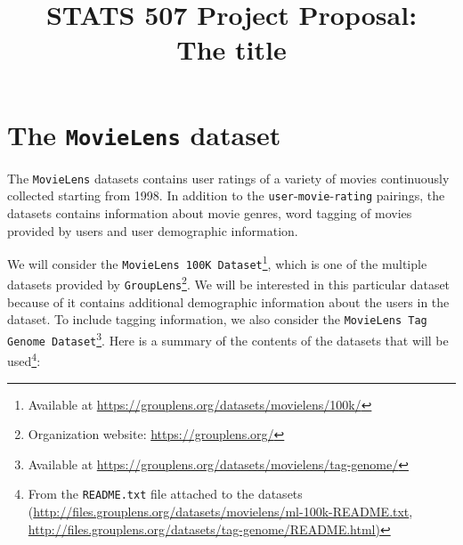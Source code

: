 \documentclass[bj, preprint]{imsart}
\begin{document}
\begin{frontmatter}

\title{{\Large STATS 507 Project Proposal:} \\ 
\bf The title}









%


\tableofcontents
\listoftodos
\end{frontmatter}



\section{The \texttt{MovieLens} dataset}\label{sec:setting}

The \texttt{MovieLens} datasets \citep{harper2015MovieLensDatasetsHistory} contains user ratings of a variety of movies continuously collected starting from 1998. 
In addition to the \texttt{user}-\texttt{movie}-\texttt{rating} pairings, the datasets contains information about movie genres, word tagging of movies provided by users and user demographic information. 

We will consider the \texttt{MovieLens 100K Dataset}\footnote{Available at \url{https://grouplens.org/datasets/movielens/100k/}}, which is one of the multiple datasets provided by \texttt{GroupLens}\footnote{Organization website: \url{https://grouplens.org/}}. 
We will be interested in this particular dataset because of it contains additional demographic information about the users in the dataset. 
To include tagging information, we also consider the \texttt{MovieLens Tag Genome Dataset}\footnote{Available at \url{https://grouplens.org/datasets/movielens/tag-genome/}}. 
Here is a summary of the contents of the datasets that will be used\footnote{From the \texttt{README.txt} file attached to the datasets (\url{http://files.grouplens.org/datasets/movielens/ml-100k-README.txt}, \url{http://files.grouplens.org/datasets/tag-genome/README.html)}}:
\end{document}
